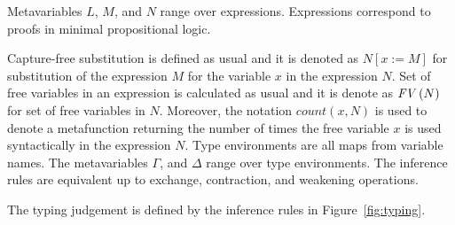 \documentclass[a4paper]{article}
\newcommand{\sbs}[3]{#1[#2:=#3]}
\newcommand{\fv}[1]{\txt{FV}\,(#1)}
\newcommand{\txt}[1]{\text{\textit{#1}}}
\begin{document}
Metavariables $L$, $M$, and $N$ range over expressions. Expressions
correspond to proofs in minimal propositional logic.


Capture-free substitution is defined as usual and it is denoted as
$\sbs{N}{x}{M}$ for substitution of the expression $M$ for the variable
$x$ in the expression $N$. Set of free variables in an expression is
calculated as usual and it is denote as $\fv{N}$ for set of free
variables in $N$. Moreover, the notation $count(x,N)$ is used to denote a
metafunction returning the number of times the free variable $x$ is
used syntactically in the expression $N$.
Type %
 environments are all maps from
variable names. The metavariables $\Gamma$, and $\Delta$ range over
type environments.  The inference rules are equivalent up to exchange,
contraction, and weakening operations.

The typing judgement is defined by the inference rules in
Figure~\ref{fig:typing}.
\end{document}
